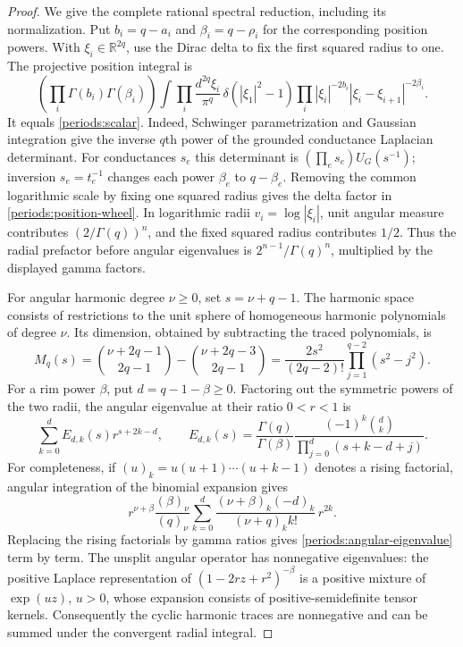 \begin{proof}
We give the complete rational spectral reduction, including its
normalization.  Put $b_i=q-a_i$ and $\beta_i=q-\rho_i$ for the
corresponding position powers.  With $\xi_i\in\mathbb R^{2q}$, use the
Dirac delta to fix the first squared radius to one.  The projective
position integral is
\begin{equation}
 \left(\prod_i\Gamma(b_i)\Gamma(\beta_i)\right)
 \int\prod_i\frac{d^{2q}\xi_i}{\pi^q}\,
 \delta(|\xi_1|^2-1)
 \prod_i|\xi_i|^{-2b_i}|\xi_i-\xi_{i+1}|^{-2\beta_i}.
 \label{periods:position-wheel}
\end{equation}
It equals \eqref{periods:scalar}.  Indeed, Schwinger parametrization and
Gaussian integration give the inverse $q$th power of the grounded
conductance Laplacian determinant.  For conductances $s_e$ this determinant
is $(\prod_e s_e)U_G(s^{-1})$; inversion $s_e=t_e^{-1}$ changes each
power $\beta_e$ to $q-\beta_e$.  Removing the common logarithmic scale
by fixing one squared radius gives the delta factor in
\eqref{periods:position-wheel}.  In logarithmic radii $v_i=\log|\xi_i|$,
unit angular measure contributes $(2/\Gamma(q))^n$, and the fixed squared
radius contributes $1/2$.  Thus the radial prefactor before angular
eigenvalues is $2^{n-1}/\Gamma(q)^n$, multiplied by the displayed gamma
factors.

For angular harmonic degree $\nu\ge0$, set $s=\nu+q-1$.  The harmonic
space consists of restrictions to the unit sphere of homogeneous
harmonic polynomials of degree $\nu$.  Its dimension, obtained by
subtracting the traced polynomials, is
\begin{equation}
 M_q(s)=
 \binom{\nu+2q-1}{2q-1}-\binom{\nu+2q-3}{2q-1}
 =\frac{2s^2}{(2q-2)!}\prod_{j=1}^{q-2}(s^2-j^2).
 \label{periods:spherical-multiplicity}
\end{equation}
For a rim power $\beta$, put $d=q-1-\beta\ge0$.  Factoring out the
symmetric powers of the two radii, the angular eigenvalue at their ratio
$0<r<1$ is
\begin{equation}
 \sum_{k=0}^{d} E_{d,k}(s)r^{s+2k-d},\qquad
 E_{d,k}(s)=\frac{\Gamma(q)}{\Gamma(\beta)}
 \frac{(-1)^k\binom dk}{\prod_{j=0}^{d}(s+k-d+j)}.
 \label{periods:angular-eigenvalue}
\end{equation}
For completeness, if $(u)_k=u(u+1)\cdots(u+k-1)$ denotes a rising
factorial, angular integration of the binomial expansion gives
\begin{equation}
 r^{\nu+\beta}\frac{(\beta)_\nu}{(q)_\nu}
 \sum_{k=0}^{d}
 \frac{(\nu+\beta)_k(-d)_k}{(\nu+q)_k k!}\,r^{2k}.
 \label{periods:terminating-angular}
\end{equation}
Replacing the rising factorials by gamma ratios gives
\eqref{periods:angular-eigenvalue} term by term.  The unsplit angular
operator has nonnegative eigenvalues: the positive Laplace representation
of $(1-2rz+r^2)^{-\beta}$ is a positive mixture of $\exp(uz)$, $u>0$,
whose expansion consists of positive-semidefinite tensor kernels.
Consequently the cyclic harmonic traces are nonnegative and can be summed
under the convergent radial integral.


\end{proof}
